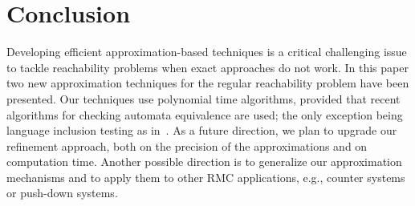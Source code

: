 \documentclass[]{llncs}
\begin{document}
\section{Conclusion}

Developing efficient approximation-based techniques is a critical
challenging issue to tackle reachability problems when exact
approaches do not work.  In this paper
two new approximation techniques for the regular reachability problem
have been presented. 
Our techniques use polynomial time algorithms, provided that 
recent algorithms for checking automata equivalence are used; the only exception being language inclusion testing 
as in~\cite{DBLP:conf/tacas/DoyenR10,DBLP:conf/tacas/AbdullaCHMV10,BONCHI-2012-674660}.
As a future direction, we plan to upgrade our refinement approach, both on the precision of the
approximations and on computation time. Another possible direction is to generalize 
our approximation mechanisms and to apply them to 
other RMC applications, e.g.,  
counter systems or push-down systems.



\end{document}
